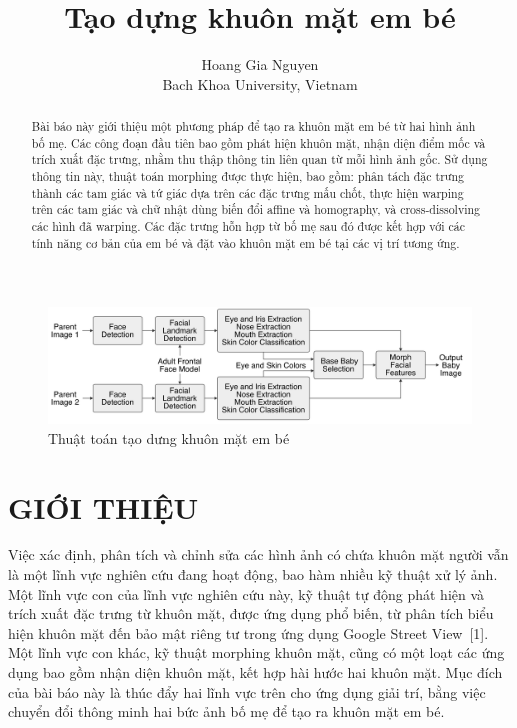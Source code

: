\documentclass[journal]{IEEEtran}
\begin{document}
\title{Tạo dựng khuôn mặt em bé}
\author{Hoang Gia Nguyen\\
Bach Khoa University, Vietnam\\}

\maketitle

\begin{center}
    \begin{figure}[htp]
    \begin{center}
     \includegraphics[scale=1]{Images/44}
    \end{center}
    \caption{Thuật toán tạo dưng khuôn mặt em bé}
    \label{refhinh1}
    \end{figure}
\end{center}

\begin{abstract}

Bài báo này giới thiệu một phương pháp để tạo ra khuôn mặt em bé từ hai hình ảnh bố mẹ. Các công đoạn đầu tiên bao gồm phát hiện khuôn mặt, nhận diện điểm mốc và trích xuất đặc trưng, nhằm thu thập thông tin liên quan từ mỗi hình ảnh gốc. Sử dụng thông tin này, thuật toán morphing được thực hiện, bao gồm: phân tách đặc trưng thành các tam giác và tứ giác dựa trên các đặc trưng mấu chốt, thực hiện warping trên các tam giác và chữ nhật dùng biến đổi affine và homography, và cross-dissolving các hình đã warping. Các đặc trưng hỗn hợp từ bố mẹ sau đó được kết hợp với các tính năng cơ bản của em bé và đặt vào khuôn mặt em bé tại các vị trí tương ứng.

\end{abstract}

\IEEEpeerreviewmaketitle

\section{GIỚI THIỆU}

Việc xác định, phân tích và chỉnh sửa các hình ảnh có chứa khuôn mặt người vẫn là một lĩnh vực nghiên cứu đang hoạt động, bao hàm nhiều kỹ thuật xử lý ảnh. Một lĩnh vực con của lĩnh vực nghiên cứu này, kỹ thuật tự động phát hiện và trích xuất đặc trưng từ khuôn mặt, được ứng dụng phổ biến, từ phân tích biểu hiện khuôn mặt đến bảo mật riêng tư trong ứng dụng Google Street View~[1]. Một lĩnh vực con khác, kỹ thuật morphing khuôn mặt, cũng có một loạt các ứng dụng bao gồm nhận diện khuôn mặt, kết hợp hài hước hai khuôn mặt. Mục đích của bài báo này là thúc đẩy hai lĩnh vực trên cho ứng dụng giải trí, bằng việc chuyển đổi thông minh hai bức ảnh bố mẹ để tạo ra khuôn mặt em bé.
\end{document}
